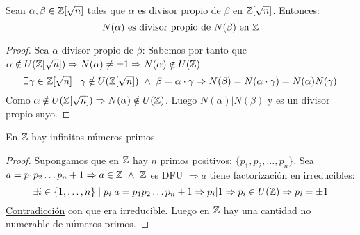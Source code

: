 \begin{lema}
    Sean $\alpha, \beta \in \mathbb Z[\sqrt{n}]$ tales que $\alpha$ es divisor propio de $\beta$ en $\mathbb Z[\sqrt{n}]$. Entonces:
    $$N(\alpha) \mbox{ es divisor propio de } N(\beta) \mbox{ en } \mathbb Z$$
\begin{proof}
    Sea $\alpha$ divisor propio de $\beta$:\newline
    Sabemos por tanto que $\alpha \notin U(\mathbb Z[\sqrt{n}]) \Rightarrow N(\alpha) \neq \pm 1 \Rightarrow N(\alpha) \notin U(\mathbb Z)$.
    \newline
    $$\exists \gamma \in \mathbb Z[\sqrt{n}] \mid \gamma \notin U(\mathbb Z[\sqrt{n}]) \ \land \  \beta = \alpha \cdot \gamma \Rightarrow
        N(\beta) = N(\alpha \cdot \gamma) = N(\alpha)N(\gamma)$$
    Como $\alpha \notin U(\mathbb Z[\sqrt{n}]) \Rightarrow N(\alpha) \notin U(\mathbb Z)$.\newline
    Luego $N(\alpha)|N(\beta)$ y es un divisor propio suyo.
\end{proof}
\end{lema}


\begin{teo}
    En $\mathbb Z$ hay infinitos números primos.
\begin{proof}
    Supongamos que en $\mathbb Z$ hay $n$ primos positivos: $\{p_1, p_2, \ldots, p_n\}$.\newline
    Sea $a=p_1p_2\ldots p_n +1 \Rightarrow a \in \mathbb Z \ \land \  \mathbb Z$ es DFU $\Rightarrow a$ tiene factorización en irreducibles:
    $$\exists i \in \{1, \ldots, n\} \mid p_i|a=p_1p_2\ldots p_n+1 \Rightarrow p_i|1 \Rightarrow p_i \in U(\mathbb Z) \Rightarrow
        p_i = \pm 1$$
    \underline{Contradicción} con que era irreducible. Luego en $\mathbb Z$ hay una cantidad no numerable de números primos.
\end{proof}
\end{teo}

